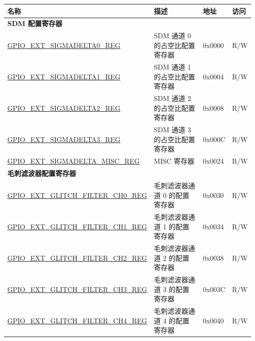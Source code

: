 \begin{longtable}{ | p{6cm} | p{7.2cm} | p{1.3cm} | p{1cm} | }
\hline\rowcolor{lightgray}
\textbf{名称} & \textbf{描述} & \textbf{地址} & \textbf{访问} \\ \hline
\endhead
\multicolumn{4}{|l|}{\textbf{SDM 配置寄存器}} \\ \hline

\hyperref[regdesc:GPIOSDSIGMADELTANREG]{GPIO\_EXT\_SIGMADELTA0\_REG} & SDM 通道 0 的占空比配置寄存器 & 0x0000 & R/W \\ \hline

\hyperref[regdesc:GPIOSDSIGMADELTANREG]{GPIO\_EXT\_SIGMADELTA1\_REG} & SDM 通道 1 的占空比配置寄存器 & 0x0004 & R/W \\ \hline

\hyperref[regdesc:GPIOSDSIGMADELTANREG]{GPIO\_EXT\_SIGMADELTA2\_REG} & SDM 通道 2 的占空比配置寄存器 & 0x0008 & R/W \\ \hline

\hyperref[regdesc:GPIOSDSIGMADELTANREG]{GPIO\_EXT\_SIGMADELTA3\_REG} & SDM 通道 3 的占空比配置寄存器 & 0x000C & R/W \\ \hline

\hyperref[regdesc:GPIOSDSIGMADELTAMISCREG]{GPIO\_EXT\_SIGMADELTA\_MISC\_REG} & MISC 寄存器 & 0x0024 & R/W \\ \hline

\multicolumn{4}{|l|}{\textbf{毛刺滤波器配置寄存器}} \\ \hline

\hyperref[regdesc:GPIOSDGLITCHFILTERCHNREG]{GPIO\_EXT\_GLITCH\_FILTER\_CH0\_REG} & 毛刺滤波器通道 0 的配置寄存器 & 0x0030 & R/W \\ \hline

\hyperref[regdesc:GPIOSDGLITCHFILTERCHNREG]{GPIO\_EXT\_GLITCH\_FILTER\_CH1\_REG} & 毛刺滤波器通道 1 的配置寄存器 & 0x0034 & R/W \\ \hline

\hyperref[regdesc:GPIOSDGLITCHFILTERCHNREG]{GPIO\_EXT\_GLITCH\_FILTER\_CH2\_REG} & 毛刺滤波器通道 2 的配置寄存器 & 0x0038 & R/W \\ \hline

\hyperref[regdesc:GPIOSDGLITCHFILTERCHNREG]{GPIO\_EXT\_GLITCH\_FILTER\_CH3\_REG} & 毛刺滤波器通道 3 的配置寄存器 & 0x003C & R/W \\ \hline

\hyperref[regdesc:GPIOSDGLITCHFILTERCHNREG]{GPIO\_EXT\_GLITCH\_FILTER\_CH4\_REG} & 毛刺滤波器通道 4 的配置寄存器 & 0x0040 & R/W \\ \hline


\end{longtable}
